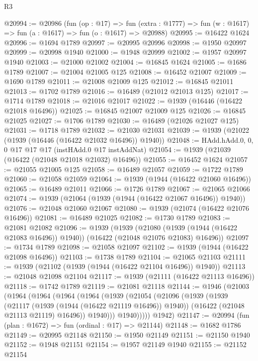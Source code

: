 \begin{lexlean}{R3}
\begin{coremodule}
@20994 := @20986
    (fun (op : @17) =>
    fun (extra : @1777) => fun (w : @1617) => fun (a : @1617) => fun (o : @1617) => @20988)
@20995 := @16422 @1624
@20996 := @1694 @1789
@20997 := @20995 @20996
@20998 := @1950 @20997
@20999 := @20998 @1940
@21000 := @1948 @20999
@21002 := @1957 @20997 @1940
@21003 := @21000 @21002
@21004 := @16845 @1624
@21005 := @1686 @1789
@21007 := @21004 @21005 @125
@21008 := @16452 @21007
@21009 := @1690 @1789
@21011 := @21008 @21009 @125
@21012 := @16845 @21011
@21013 := @1702 @1789
@21016 := @16489 (@21012 @21013 @125)
@21017 := @1714 @1789
@21018 := @21016 @21017
@21022 := @1939 (@16446 (@16422 @21018 @16496))
@21025 := @16845 @21007 @21009 @125
@21026 := @16845 @21025
@21027 := @1706 @1789
@21030 := @16489 (@21026 @21027 @125)
@21031 := @1718 @1789
@21032 := @21030 @21031
@21039 := @1939 (@21022 (@1939 (@16446 (@16422 @21032 @16496)) @1940))
@21048 := HAdd.hAdd.{0, 0, 0} @17 @17 @17 (instHAdd.{0} @17 instAddNat)
@21054 := @1939 (@21039 (@16422 (@21048 @21018 @21032) @16496))
@21055 := @16452 @1624
@21057 := @21055 @21005 @125
@21058 := @16489 @21057
@21059 := @1722 @1789
@21060 := @21058 @21059
@21064 := @1939 (@1944 (@16422 @21060 @16496))
@21065 := @16489 @21011
@21066 := @1726 @1789
@21067 := @21065 @21066
@21074 := @1939 (@21064 (@1939 (@1944 (@16422 @21067 @16496)) @1940))
@21076 := @21048 @21060 @21067
@21080 := @1939 (@21074 (@16422 @21076 @16496))
@21081 := @16489 @21025
@21082 := @1730 @1789
@21083 := @21081 @21082
@21096 := @1939
    (@1939
      (@21080 (@1939 (@1944 (@16422 @21083 @16496)) @1940))
      (@16422 (@21048 @21076 @21083) @16496))
@21097 := @1734 @1789
@21098 := @21058 @21097
@21102 := @1939 (@1944 (@16422 @21098 @16496))
@21103 := @1738 @1789
@21104 := @21065 @21103
@21111 := @1939 (@21102 (@1939 (@1944 (@16422 @21104 @16496)) @1940))
@21113 := @21048 @21098 @21104
@21117 := @1939 (@21111 (@16422 @21113 @16496))
@21118 := @1742 @1789
@21119 := @21081 @21118
@21144 := @1946
    (@21003
      (@1964
        (@1964
          (@1964
            (@1964
              (@1939
                (@21054
                  (@21096
                    (@1939
                      (@1939
                        (@21117 (@1939 (@1944 (@16422 @21119 @16496)) @1940))
                        (@16422 (@21048 @21113 @21119) @16496))
                      @1940)))
                @1940)))))
      @1942)
@21147 := @20994 (fun (plan : @1672) => fun (ordinal : @17) => @21144)
@21148 := @1682 @1786
@21149 := @20995 @21148
@21150 := @1950 @21149
@21151 := @21150 @1940
@21152 := @1948 @21151
@21154 := @1957 @21149 @1940
@21155 := @21152 @21154

\end{coremodule}
\end{lexlean}
